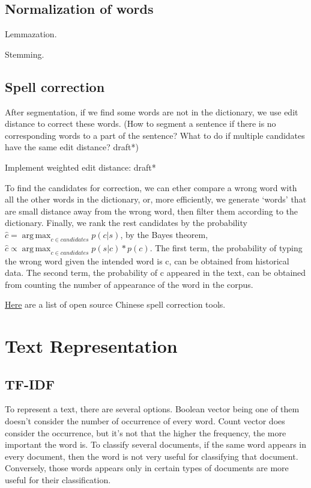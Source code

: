 \documentclass{report}
\DeclareMathOperator*{\argmax}{arg\,max}
\begin{document}
\section{Normalization of words}
Lemmazation.

Stemming.

\section{Spell correction}
After segmentation, if we find some words are not in the dictionary, we use edit distance to correct these words. (How to segment a sentence if there is no corresponding words to a part of the sentence? What to do if multiple candidates have the same edit distance? draft*)

Implement weighted edit distance: draft*

To find the candidates for correction, we can ether compare a wrong word with all the other words in the dictionary, or, more efficiently, we generate `words' that are small distance away from the wrong word, then filter them according to the dictionary. Finally, we rank the rest candidates by the probability $\hat{c} = \argmax_{c \in candidates} p(c|s)$, by the Bayes theorem, $\hat{c} \propto \argmax_{c \in candidates} p(s|c) * p(c)$. The first term, the probability of typing the wrong word given the intended word is c, can be obtained from historical data. The second term, the probability of c appeared in the text, can be obtained from counting the number of appearance of the word in the corpus.

\href{https://github.com/li-aolong/li-aolong.github.io/issues/12}{Here} are a list of open source Chinese spell correction tools.

\chapter{Text Representation}
\section{TF-IDF}
To represent a text, there are several options. Boolean vector being one of them doesn't consider the number of occurrence of every word. Count vector does consider the occurrence, but it's not that the higher the frequency, the more important the word is. To classify several documents, if the same word appears in every document, then the word is not very useful for classifying that document. Conversely, those words appears only in certain types of documents are more useful for their classification.
\end{document}

